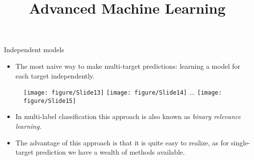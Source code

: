 \documentclass[11pt,compress,t,notes=noshow, xcolor=table]{beamer}
\title{Advanced Machine Learning}
\date{}
\begin{document}



\sloppy


\begin{frame}{Independent models}
%	
	\begin{itemize}
		\item 	The most naive way to make multi-target predictions: learning a model for each target independently.
%	
	\end{itemize}

	\begin{figure}
		\centering
		\texttt{[image: figure/Slide13]}
		\texttt{[image: figure/Slide14]} 
%		
		$\ldots$
%		
		\texttt{[image: figure/Slide15]}
	\end{figure}
%	
%
	\begin{itemize}
%		
		\item In multi-label classification this approach is also known as \emph{binary relevance learning.}
		\item The advantage of this approach is that it is quite easy to realize, as for single-target prediction we have a wealth of methods available.
	\end{itemize}

\end{frame}
\end{document}
